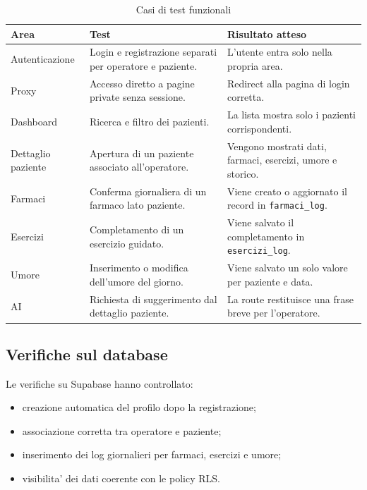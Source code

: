 \begin{table}[H]
\centering
\renewcommand{\arraystretch}{1.25}
\begin{tabularx}{\textwidth}{|p{4cm}|X|X|}
\hline
\textbf{Area} & \textbf{Test} & \textbf{Risultato atteso} \\
\hline
Autenticazione & Login e registrazione separati per operatore e paziente. & L'utente entra solo nella propria area. \\
\hline
Proxy & Accesso diretto a pagine private senza sessione. & Redirect alla pagina di login corretta. \\
\hline
Dashboard & Ricerca e filtro dei pazienti. & La lista mostra solo i pazienti corrispondenti. \\
\hline
Dettaglio paziente & Apertura di un paziente associato all'operatore. & Vengono mostrati dati, farmaci, esercizi, umore e storico. \\
\hline
Farmaci & Conferma giornaliera di un farmaco lato paziente. & Viene creato o aggiornato il record in \texttt{farmaci\_log}. \\
\hline
Esercizi & Completamento di un esercizio guidato. & Viene salvato il completamento in \texttt{esercizi\_log}. \\
\hline
Umore & Inserimento o modifica dell'umore del giorno. & Viene salvato un solo valore per paziente e data. \\
\hline
AI & Richiesta di suggerimento dal dettaglio paziente. & La route restituisce una frase breve per l'operatore. \\
\hline
\end{tabularx}
\caption{Casi di test funzionali}
\label{tab:casi-test}
\end{table}

\subsection{Verifiche sul database}

Le verifiche su Supabase hanno controllato:

\begin{itemize}
    \item creazione automatica del profilo dopo la registrazione;
    \item associazione corretta tra operatore e paziente;
    \item inserimento dei log giornalieri per farmaci, esercizi e umore;
    \item visibilita' dei dati coerente con le policy RLS.
\end{itemize}

\newpage
